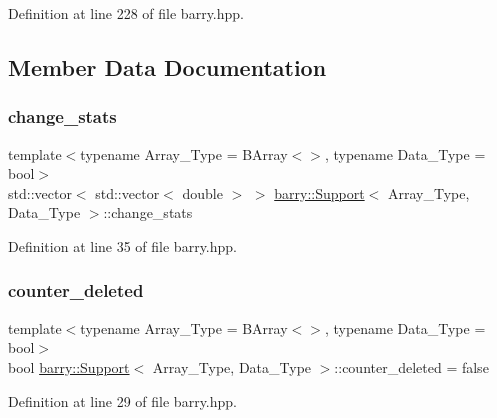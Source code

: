 Definition at line 228 of file barry.\+hpp.



\subsection{Member Data Documentation}
\mbox{\label{classbarry_1_1_support_a09cebbb8953514f77e2f70d447d3ff2a}} 
\subsubsection{\texorpdfstring{change\+\_\+stats}{change\_stats}}
{\footnotesize\ttfamily template$<$typename Array\+\_\+\+Type  = B\+Array$<$$>$, typename Data\+\_\+\+Type  = bool$>$ \\
std\+::vector$<$ std\+::vector$<$ double $>$ $>$ \hyperlink{classbarry_1_1_support}{barry\+::\+Support}$<$ Array\+\_\+\+Type, Data\+\_\+\+Type $>$\+::change\+\_\+stats}



Definition at line 35 of file barry.\+hpp.

\mbox{\label{classbarry_1_1_support_a96c18c68794e756bc84ee2405dca505a}} 
\subsubsection{\texorpdfstring{counter\+\_\+deleted}{counter\_deleted}}
{\footnotesize\ttfamily template$<$typename Array\+\_\+\+Type  = B\+Array$<$$>$, typename Data\+\_\+\+Type  = bool$>$ \\
bool \hyperlink{classbarry_1_1_support}{barry\+::\+Support}$<$ Array\+\_\+\+Type, Data\+\_\+\+Type $>$\+::counter\+\_\+deleted = false}



Definition at line 29 of file barry.\+hpp.

\mbox{\label{classbarry_1_1_support_ab7cd458219742709c0a214d7bf70b7d9}} 
